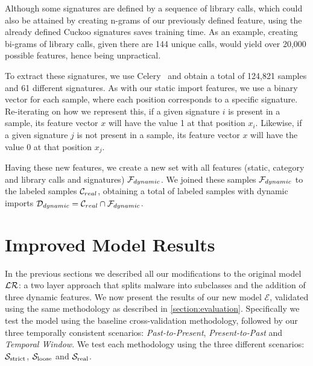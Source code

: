 Although some signatures are defined by a sequence of library calls, which could also be attained by creating n-grams of our previously defined feature, using the already defined Cuckoo signatures saves training time.
As an example, creating bi-grams of library calls, given there are 144 unique calls, would yield over 20,000 possible features, hence being unpractical.

To extract these signatures, we use Celery~\cite{tool:celery} and obtain a total of 124,821 samples and 61 different signatures.
As with our static import features, we use a binary vector for each sample, where each position corresponds to a specific signature. Re-iterating on how we represent this, if a given signature $i$ is present in a sample, its feature vector $x$ will have the value 1 at that position $x_i$. Likewise, if a given signature $j$ is not present in a sample, its feature vector $x$ will have the value 0 at that position $x_j$.

\medskip

Having these new features, we create a new set with all features (static, category and library calls and signatures) $\mathcal{F}_{dynamic}$.
We joined these samples $\mathcal{F}_{dynamic}$ to the labeled samples $\mathcal{C}_{real}$, obtaining a total of  labeled samples with dynamic imports $\mathcal{D}_{dynamic} = \mathcal{C}_{real} \cap \mathcal{F}_{dynamic}$.


\section{Improved Model Results}
\label{section:improvements_results}

In the previous sections we described all our modifications to the original model $\mathcal{LR}$: a two layer approach that splits malware into subclasses and the addition of three dynamic features.
We now present the results of our new model $\mathcal{E}$, validated using the same methodology as described in \ref{section:evaluation}.
Specifically we test the model using the baseline cross-validation methodology, followed by our three temporally consistent scenarios: \textit{Past-to-Present}, \textit{Present-to-Past} and \textit{Temporal Window}.
We test each methodology using the three different scenarios: $\mathcal{S}_{\mathrm{strict}}$, $\mathcal{S}_{\mathrm{loose}}$ and $\mathcal{S}_{\mathrm{real}}$.

